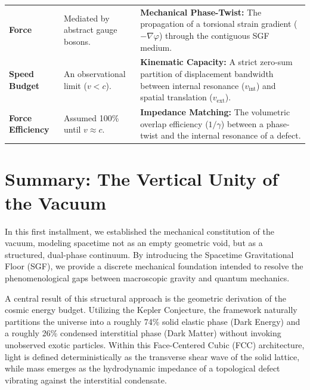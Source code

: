 \begin{table}[H]
\begin{tabular}{@{} >{\raggedright\arraybackslash}p{3cm} >{\raggedright\arraybackslash}p{5.5cm} >{\raggedright\arraybackslash}p{6cm} @{} }
\textbf{Force} & Mediated by abstract gauge bosons. & \textbf{Mechanical Phase-Twist:} The propagation of a torsional strain gradient ($-\nabla\varphi$) through the contiguous SGF medium. \\
\textbf{Speed Budget} & An observational limit ($v < c$). & \textbf{Kinematic Capacity:} A strict zero-sum partition of displacement bandwidth between internal resonance ($v_{\mathrm{int}}$) and spatial translation ($v_{\mathrm{ext}}$). \\
\textbf{Force Efficiency} & Assumed 100\% until $v \approx c$. & \textbf{Impedance Matching:} The volumetric overlap efficiency ($1/\gamma$) between a phase-twist and the internal resonance of a defect. \\
\bottomrule
\end{tabular}
\end{table}

\clearpage %
\section*{Summary: The Vertical Unity of the Vacuum}

In this first installment, we established the mechanical constitution of the vacuum, modeling spacetime not as an empty geometric void, but as a structured, dual-phase continuum. By introducing the Spacetime Gravitational Floor (SGF), we provide a discrete mechanical foundation intended to resolve the phenomenological gaps between macroscopic gravity and quantum mechanics.

A central result of this structural approach is the geometric derivation of the cosmic energy budget. Utilizing the Kepler Conjecture, the framework naturally partitions the universe into a roughly 74\% solid elastic phase (Dark Energy) and a roughly 26\% condensed interstitial phase (Dark Matter) without invoking unobserved exotic particles. Within this Face-Centered Cubic (FCC) architecture, light is defined deterministically as the transverse shear wave of the solid lattice, while mass emerges as the hydrodynamic impedance of a topological defect vibrating against the interstitial condensate.

